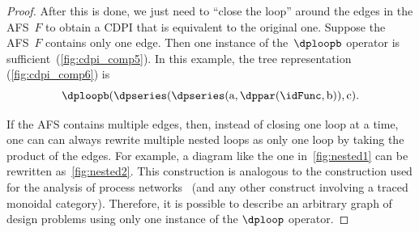 \begin{proof}
After this is done, we just need to ``close the loop'' around the
edges in the AFS~$F$ to obtain a CDPI that is equivalent to the
original one. Suppose the AFS~$F$ contains only one edge. Then one
instance of the~$\dploopb$ operator is sufficient~(\cref{fig:cdpi_comp5}).
In this example, the tree representation (\cref{fig:cdpi_comp6}) is
\[
\dploopb(\dpseries(\dpseries(\text{a},\dppar(\idFunc,\text{b})),\text{c}).
\]


If the AFS contains multiple edges, then, instead of closing one loop
at a time, one can can always rewrite multiple nested loops as only
one loop by taking the product of the edges. For example, a diagram
like the one in~\cref{fig:nested1} can be rewritten as~\cref{fig:nested2}.
This construction is analogous to the construction used for the analysis
of process networks~\cite{lee10} (and any other construct involving
a traced monoidal category). Therefore, it is possible to describe
an arbitrary graph of design problems using only one instance of the
$\dploop$ operator.
\end{proof}


